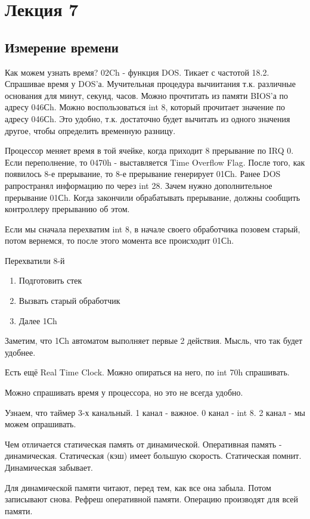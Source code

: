 \section{Лекция 7}
\subsection{Измерение времени}
Как можем узнать время? 02Ch - функция DOS. Тикает с частотой 18.2. Спрашивае время у DOS'а. 
Мучительная процедура вычиитания т.к. различные основания для минут, секунд, часов. Можно прочтитать из памяти BIOS'а по адресу 046Сh. Можно воспользоваться int 8, который прочитает значение по адресу 046Сh. Это удобно, т.к. достаточно будет вычитать из одного значения другое, чтобы определить временную разницу. 

Процессор меняет время в той ячейке, когда приходит 8 прерывание по IRQ 0.
Если переполнение, то 0470h - выставляется Time Overflow Flag. 
После того, как появилось 8-е прерывание, то 8-е прерывание генерирует 01Сh. Ранее DOS рапространял информацию по через int 28. Зачем нужно дополнительное прерывание 01Сh. Когда закончили обрабатывать прерывание, должны сообщить контроллеру прерыванию об этом.

Если мы сначала перехватим int 8, в начале своего обработчика позовем старый, потом вернемся, то после этого момента все происходит 01Сh.

Перехватили 8-й
\begin{enumerate}
\item Подготовить стек
\item Вызвать старый обработчик
\item Далее 1Сh
\end{enumerate}
Заметим, что 1Сh автоматом выполняет первые 2 действия. Мысль, что так будет удобнее. 

Есть ещё Real Time Clock. Можно опираться на него, по int 70h спрашивать. 

Можно спрашивать время у процессора, но это не всегда удобно.

Узнаем, что таймер 3-х канальный. 1 канал - важное. 0 канал - int 8. 2 канал - мы можем опрашивать.  
 
Чем отличается статическая память от динамической. Оперативная память - динамическая. Статическая (кэш) имеет большую скорость. Статическая помнит. Динамическая забывает. 

Для динамической памяти читают, перед тем, как все она забыла. Потом записывают снова. Рефреш оперативной памяти. Операцию производят для всей памяти. 

